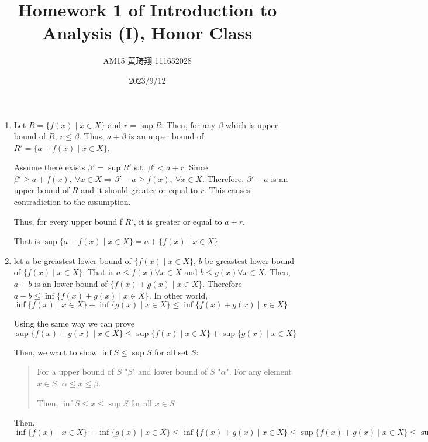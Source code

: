 \documentclass[12pt]{article}
\title{Homework 1 of Introduction to Analysis (I), Honor Class}
\author{AM15 黃琦翔 111652028}
\date{2023/9/12}
\begin{document}
\maketitle
\begin{enumerate}
    \item Let $R = \lbrace f(x) \mid x \in X \rbrace$ and $r = \sup R$. 
    Then, for any $\beta$ which is upper bound of $R$, $r \leq \beta$. 
    Thus, $a + \beta$ is an upper bound of $R' = \lbrace a + f(x) \mid x \in X \rbrace$.

    Assume there exists $\beta' = \sup R'$ s.t. $\beta' < a+r$. 
    Since $\beta' \geq a + f(x),\ \forall x \in X \Rightarrow \beta' - a \geq f(x),\ \forall x \in X$. 
    Therefore, $\beta' - a$ is an upper bound of $R$ and it should greater or equal to $r$. 
    This causes contradiction to the assumption.

    Thus, for every upper bound f $R'$, it is greater or equal to $a + r$.
    
    That is $\sup\lbrace a + f(x) \mid x \in X \rbrace = a + \lbrace f(x) \mid x \in X \rbrace$

    \item let $a$ be greastest lower bound of $\lbrace f(x) \mid x \in X\rbrace$, $b$ be greastest lower bound of $\lbrace f(x) \mid x \in X\rbrace$.
    That is $a \leq f(x) \forall x \in X$ and $b \leq g(x) \forall x \in X$.
    Then, $a + b$ is an lower bound of $\lbrace f(x) + g(x) \mid x \in X \rbrace$. Therefore $a + b \leq \inf \lbrace f(x) + g(x) \mid x \in X\rbrace$.
    In other world, $\inf \lbrace f(x) \mid x \in X\rbrace + \inf \lbrace g(x) \mid x \in X\rbrace \leq \inf \lbrace f(x) + g(x) \mid x \in X\rbrace$

    Using the same way we can prove $\sup \lbrace f(x) + g(x) \mid x \in X \rbrace \leq \sup \lbrace f(x) \mid x \in X \rbrace + \sup \lbrace g(x) \mid x \in X \rbrace$

    Then, we want to show $\inf S \leq \sup S$ for all set $S$:
    \begin{quote}
        For a upper bound of $S$ "$\beta$" and lower bound of $S$ "$\alpha$". For any element $x \in S$, $\alpha \leq x \leq \beta$.

        Then, $\inf S \leq x \leq \sup S$ for all $x\in S$
    \end{quote}

    Then, $\inf \lbrace f(x) \mid x \in X \rbrace + \inf \lbrace g(x) \mid x \in X \rbrace \leq \inf \lbrace f(x) + g(x) \mid x \in X\rbrace \leq \sup \lbrace f(x) + g(x) \mid x \in X \rbrace \leq \sup \lbrace f(x) \mid x \in X \rbrace + \sup \lbrace g(x) \mid x \in X \rbrace$
    

\end{enumerate}
\end{document}

